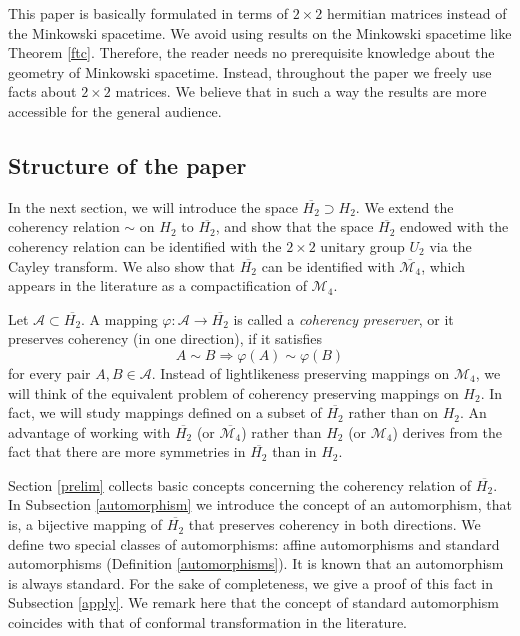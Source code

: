 \documentclass[10pt,a4paper]{amsart}
\providecommand{\index}[1]{}
\newcommand\oH{{\overline{H_2}}}
\theoremstyle{definition}
\theoremstyle{remark}
\numberwithin{subsection}{section}
\numberwithin{equation}{section}
\begin{document}
This paper is basically formulated in terms of $2\times 2$ hermitian matrices instead of the Minkowski spacetime.
We avoid using results on the Minkowski spacetime like Theorem \ref{ftc}.
Therefore, the reader needs no prerequisite knowledge about the geometry of Minkowski spacetime. 
Instead, throughout the paper we freely use facts about $2\times 2$ matrices. We believe that in such a way the results are more accessible for the general audience.




\subsection{Structure of the paper} 
In the next section, we will introduce the space $\overline{H_2}\supset H_2$. 
We extend the coherency relation $\sim$ on $H_2$ to $\oH$, and show that the space $\overline{H_2}$ endowed with the coherency relation can be identified with the $2\times 2$ unitary group $U_2$ via the Cayley transform. 
We also show that $\oH$ can be identified with $\overline{\mathcal{M}_4}$, which appears in the literature as a compactification of $\mathcal{M}_4$.  

Let $\mathcal{A}\subset \oH$. 
A mapping $\varphi\colon \mathcal{A}\to \oH$ is called a \emph{coherency preserver}\index{coherency preserver}, or it preserves coherency (in one direction), if it satisfies 
\[
A\sim B\Rightarrow \varphi(A) \sim \varphi(B)
\]
for every pair $A, B\in \mathcal{A}$.
Instead of lightlikeness preserving mappings on $\mathcal{M}_4$, we will think of the equivalent problem of coherency preserving mappings on $H_2$.
In fact, we will study mappings defined on a subset of $\oH$ rather than on $H_2$.
An advantage of working with $\oH$ (or $\overline{\mathcal{M}_4}$) rather than $H_2$ (or $\mathcal{M}_4$) derives from the fact that there are more symmetries in $\oH$ than in $H_2$. 

Section \ref{prelim} collects basic concepts concerning the coherency relation of $\oH$. 
In Subsection \ref{automorphism} we introduce the concept of an automorphism, that is, a bijective mapping of $\oH$ that preserves coherency in both directions. 
We define two special classes of automorphisms: affine automorphisms and standard automorphisms (Definition \ref{automorphisms}). 
It is known that an automorphism is always standard. For the sake of completeness, we give a proof of this fact in Subsection \ref{apply}.
We remark here that the concept of standard automorphism coincides with that of conformal transformation in the literature. \index{conformal transformation}
\end{document}
